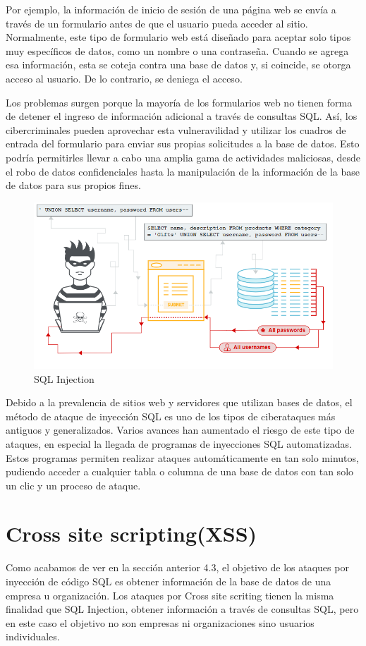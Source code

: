 Por ejemplo, la información de inicio de sesión de una página web se envía a través de un formulario antes de que el usuario pueda acceder al sitio. Normalmente, 
este tipo de formulario web está diseñado para aceptar solo tipos muy específicos de datos, como un nombre o una contraseña. Cuando se agrega esa información, 
esta se coteja contra una base de datos y, si coincide, se otorga acceso al usuario. De lo contrario, se deniega el acceso.

Los problemas surgen porque la mayoría de los formularios web no tienen forma de detener el ingreso de información adicional a través de consultas SQL. Así, los 
cibercriminales pueden aprovechar esta vulneravilidad y utilizar los cuadros de entrada del formulario para enviar sus propias solicitudes a la base de datos. Esto 
podría permitirles llevar a cabo una amplia gama de actividades maliciosas, desde el robo de datos confidenciales hasta la manipulación de la información de la base 
de datos para sus propios fines.

\begin{figure}[tphb]
  		   \centering
     		   \includegraphics[width=5in]{sqli.png}
  		   \caption{SQL Injection \cite{sqli}}
  		   \label{img:sqli}
\end{figure}

Debido a la prevalencia de sitios web y servidores que utilizan bases de datos, el método de ataque de inyección SQL es uno de los tipos de ciberataques más antiguos 
y generalizados. Varios avances han aumentado el riesgo de este tipo de ataques, en especial la llegada de programas de inyecciones SQL automatizadas. Estos
programas permiten realizar ataques automáticamente en tan solo minutos, pudiendo acceder a cualquier tabla o columna de una base de datos con tan solo un clic 
y un proceso de ataque.

\section{Cross site scripting(XSS)}
\label{sec:Cross site scripting}
Como acabamos de ver en la sección anterior 4.3, el objetivo de los ataques por inyección de código SQL es obtener información de la base de datos de una empresa 
u organización. Los ataques por Cross site scriting tienen la misma finalidad que SQL Injection, obtener información a través de consultas SQL, pero en este caso el 
objetivo no son empresas ni organizaciones sino usuarios individuales.

